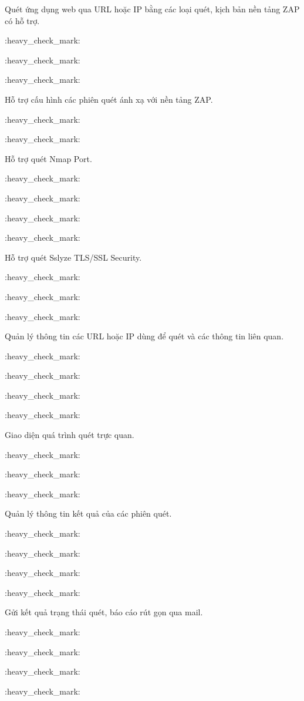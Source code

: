 Quét ứng dụng web qua URL hoặc IP bằng các loại quét, kịch bản nền tảng ZAP có hỗ trợ.

:heavy_check_mark:  

:heavy_check_mark:  

 

:heavy_check_mark:  

Hỗ trợ cấu hình các phiên quét ánh xạ với nền tảng ZAP.

:heavy_check_mark:  

:heavy_check_mark:  

 

 

Hỗ trợ quét Nmap Port.

:heavy_check_mark:  

:heavy_check_mark:  

:heavy_check_mark:  

:heavy_check_mark:  

Hỗ trợ quét Sslyze TLS/SSL Security.

:heavy_check_mark:  

:heavy_check_mark:  

:heavy_check_mark:  

 

Quản lý thông tin các URL hoặc IP dùng để quét và các thông tin liên quan.

:heavy_check_mark:  

:heavy_check_mark:  

:heavy_check_mark:  

:heavy_check_mark:  

Giao diện quá trình quét trực quan.

:heavy_check_mark:  

:heavy_check_mark:  

:heavy_check_mark:  

 

Quản lý thông tin kết quả của các phiên quét.

:heavy_check_mark:  

:heavy_check_mark:  

:heavy_check_mark:  

:heavy_check_mark:  

Gửi kết quả trạng thái quét, báo cáo rút gọn qua mail.

:heavy_check_mark:  

:heavy_check_mark:  

:heavy_check_mark:  

:heavy_check_mark:  

